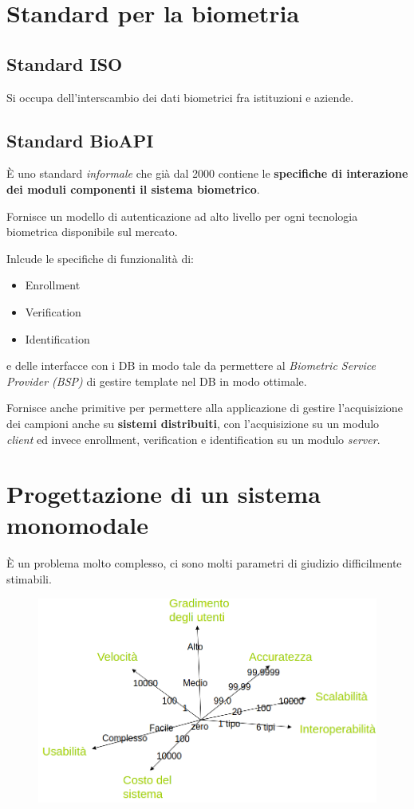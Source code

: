 \documentclass{report}
\begin{document}
\chapter{Standard per la biometria}


\section{Standard ISO}
Si occupa dell'interscambio dei dati biometrici 
fra istituzioni e aziende.


\section{Standard BioAPI}
È uno standard \textit{informale} che già dal 2000 contiene le \textbf{specifiche 
di interazione dei moduli componenti il sistema biometrico}.

\noindent Fornisce un modello di autenticazione ad alto livello per ogni 
tecnologia biometrica disponibile sul mercato.

\noindent Inlcude le specifiche di funzionalità di:
\begin{itemize}
    \item Enrollment
    \item Verification 
    \item Identification
\end{itemize}

e delle interfacce con i DB in modo tale da permettere al \textit{Biometric Service Provider (BSP)} di 
gestire template nel DB in modo ottimale.


\noindent Fornisce anche primitive per permettere alla applicazione di gestire l'acquisizione 
dei campioni anche su \textbf{sistemi distribuiti}, con l'acquisizione su un modulo \textit{client}
ed invece enrollment, verification e identification su un modulo \textit{server}.



\chapter{Progettazione di un sistema monomodale}
È un problema molto complesso, ci sono molti parametri di giudizio
difficilmente stimabili.

\begin{figure}[H]
    \centering
    \includegraphics[width=0.8\linewidth]{images/params.png}
\end{figure}
\end{document}
